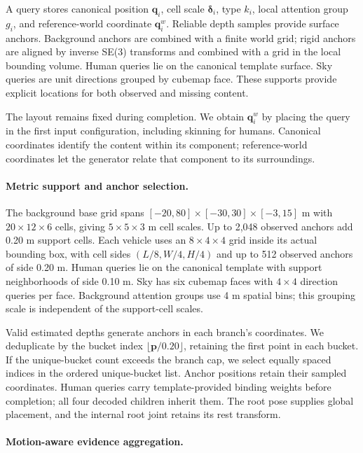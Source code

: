 A query stores canonical position $\mathbf q_i$, cell scale $\boldsymbol\delta_i$, type $k_i$, local attention group $g_i$, and reference-world coordinate $\mathbf q_i^w$. Reliable depth samples provide surface anchors. Background anchors are combined with a finite world grid; rigid anchors are aligned by inverse SE(3) transforms and combined with a grid in the local bounding volume. Human queries lie on the canonical template surface. Sky queries are unit directions grouped by cubemap face. These supports provide explicit locations for both observed and missing content.

The layout remains fixed during completion. We obtain $\mathbf q_i^w$ by placing the query in the first input configuration, including skinning for humans. Canonical coordinates identify the content within its component; reference-world coordinates let the generator relate that component to its surroundings.

\paragraph{Metric support and anchor selection.}
The background base grid spans $[-20,80]\times[-30,30]\times[-3,15]$ m with $20\times12\times6$ cells, giving $5\times5\times3$ m cell scales. Up to 2,048 observed anchors add 0.20 m support cells. Each vehicle uses an $8\times4\times4$ grid inside its actual bounding box, with cell sides $(L/8,W/4,H/4)$ and up to 512 observed anchors of side 0.20 m. Human queries lie on the canonical template with support neighborhoods of side 0.10 m. Sky has six cubemap faces with $4\times4$ direction queries per face. Background attention groups use 4 m spatial bins; this grouping scale is independent of the support-cell scales.

Valid estimated depths generate anchors in each branch's coordinates. We deduplicate by the bucket index $\lfloor\mathbf p/0.20\rfloor$, retaining the first point in each bucket. If the unique-bucket count exceeds the branch cap, we select equally spaced indices in the ordered unique-bucket list. Anchor positions retain their sampled coordinates. Human queries carry template-provided binding weights before completion; all four decoded children inherit them. The root pose supplies global placement, and the internal root joint retains its rest transform.

\paragraph{Motion-aware evidence aggregation.}

